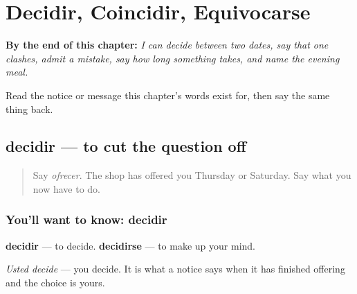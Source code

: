 
\chapter{Decidir, Coincidir, Equivocarse}
\label{ch:es-plan}

\begin{chapteropening}
\textbf{By the end of this chapter:} \emph{I can decide between two dates, say that one clashes, admit a mistake, say how long something takes, and name the evening meal.}

Read the notice or message this chapter's words exist for, then say the same thing back.
\end{chapteropening}

\section[decidir]{decidir — to cut the question off}

\label{lesson:ES-C437-decidir}



\begin{quote}
Say \emph{ofrecer}. The shop has offered you Thursday or Saturday. Say what you now have to do.
\end{quote}

\subsection*{You'll want to know: decidir}
\textbf{decidir} — to decide. \textbf{decidirse} — to make up your mind.

\emph{Usted decide} — you decide. It is what a notice says when it has finished offering and the choice is yours.

